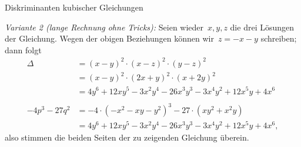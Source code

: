 \documentclass{algblatt}
\begin{document}
\begin{aufgabe}{Diskriminanten kubischer Gleichungen}
\begin{loesungE}
\emph{Variante 2 (lange Rechnung ohne Tricks):} Seien wieder~$x,y,z$ die drei
Lösungen der Gleichung. Wegen der obigen Beziehungen können wir~$z = -x-y$
schreiben; dann folgt
\begin{align*}
  \Delta &= (x-y)^2 \cdot (x-z)^2 \cdot (y-z)^2 \\
  &= (x-y)^2 \cdot (2x + y)^2 \cdot (x + 2y)^2 \\
  &= 4y^6+12xy^5-3x^2y^4-26x^3y^3-3x^4y^2+12x^5y+4x^6 \\
  \\
  -4p^3 - 27q^2 &= -4 \cdot (-x^2 - xy - y^2)^3 - 27 \cdot (xy^2 + x^2y) \\
  &= 4y^6+12xy^5-3x^2y^4-26x^3y^3-3x^4y^2+12x^5y+4x^6,
\end{align*}
also stimmen die beiden Seiten der zu zeigenden Gleichung überein.


\end{loesungE}
\end{aufgabe}
\end{document}
